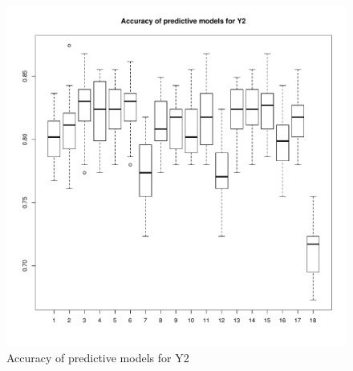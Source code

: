 \documentclass[11pt,oneside,a4paper]{article}
\begin{document}
\begin{figure}[!ht]
    \centering
	\includegraphics[scale=0.8]{./pic/class_prediction.pdf}
    \caption{Accuracy of predictive models for Y2}
 	\label{accy2}
\end{figure}
\end{document}

